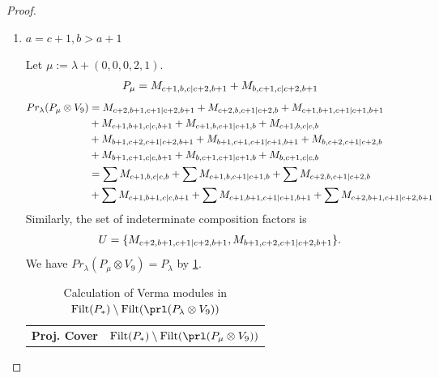 \begin{proof}
\begin{enumerate}
\begin{enumerate}
      \item $a=c+1, b>a+1$ \par
        Let $\mu:=\lambda + (0,0,0,2,1) $.
        \begin{equation}\notag
          \begin{aligned}
            P_\mu = M_{c+1,b,c|c+2,b+1}
+ M_{b,c+1,c|c+2,b+1}
          \end{aligned}
        \end{equation}
        \begin{equation}\notag
          \begin{aligned}
            Pr_{\lambda}(P_\mu \otimes V_{9}) &=
M_{c+2,b+1,c+1|c+2,b+1}
+ M_{c+2,b,c+1|c+2,b}
+ M_{c+1,b+1,c+1|c+1,b+1}\\
                                              &
+ M_{c+1,b+1,c|c,b+1}
+ M_{c+1,b,c+1|c+1,b}
+ M_{c+1,b,c|c,b}\\
                                              &
+ M_{b+1,c+2,c+1|c+2,b+1}
+ M_{b+1,c+1,c+1|c+1,b+1}
+ M_{b,c+2,c+1|c+2,b}\\
                                              &
+ M_{b+1,c+1,c|c,b+1}
+ M_{b,c+1,c+1|c+1,b}
+ M_{b,c+1,c|c,b} \\
                                               &=
\sum M_{c+1,b,c|c,b}
+ \sum M_{c+1,b,c+1|c+1,b}
+ \sum M_{c+2,b,c+1|c+2,b}\\
                                              &
+ \sum M_{c+1,b+1,c|c,b+1}
+ \sum M_{c+1,b+1,c+1|c+1,b+1}
+ \sum M_{c+2,b+1,c+1|c+2,b+1}
          \end{aligned}
        \end{equation}
      Similarly, the set of indeterminate composition factors is 
\begin{equation}\notag
  \begin{aligned}
    U = \{
M_{c+2,b+1,c+1|c+2,b+1},
M_{b+1,c+2,c+1|c+2,b+1}
\}.
  \end{aligned}
\end{equation}
       We have $Pr_{\lambda}(P_\mu \otimes V_{9}) = P_\lambda  $ by \cref{tab:verma-analysis_b_6}.
\begin{table}[htbp]
\centering
\caption{Calculation of Verma modules in $\operatorname{Filt}(P_*) \setminus \operatorname{Filt}(\prl(P_\lambda \otimes V_{9})) $ } \label{tab:verma-analysis_b_6}
\begin{tabular}{cc}
\toprule
\textbf{Proj. Cover} & \textbf{$\operatorname{Filt}(P_*) \setminus \operatorname{Filt}(\prl(P_\mu \otimes V_{9})) $}  \\

\end{tabular}
\end{table}
\end{enumerate}
\end{enumerate}
\end{proof}
